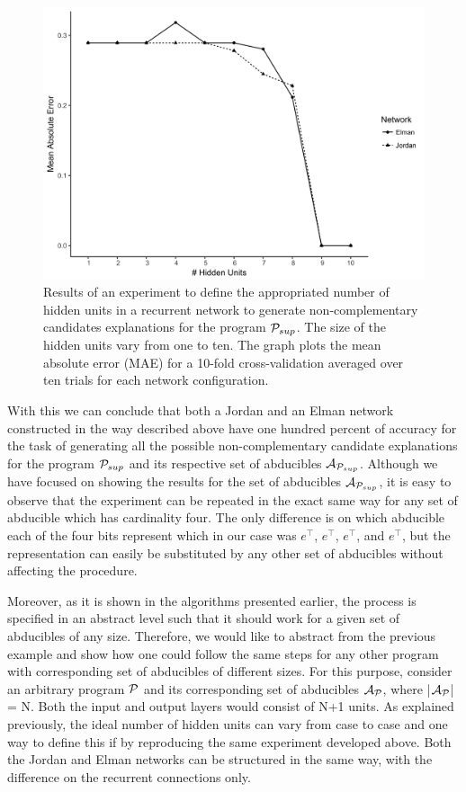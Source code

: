 \begin{figure}
	\centering
	\includegraphics[width=1.0\textwidth]{figures/error_nc_4}
	\caption{Results of an experiment to define the appropriated number of hidden units in a recurrent network to generate non-complementary candidates explanations for the program $\mathcal{P}_{sup}$. The size of the hidden units vary from one to ten. The graph plots the mean absolute error (MAE) for a 10-fold cross-validation averaged over ten trials for each network configuration.}
	\label{fig:error_nc_4}
\end{figure}

With this we can conclude that both a Jordan and an Elman network constructed in the way described above have one hundred percent of accuracy for the task of generating all the possible non-complementary candidate explanations for the program $\mathcal{P}_{sup}$ and its respective set of abducibles $\mathcal{A}_{\mathcal{P}_{sup}}$. Although we have focused on showing the results for the set of abducibles $\mathcal{A}_{\mathcal{P}_{sup}}$, it is easy to observe that the experiment can be repeated in the exact same way for any set of abducible which has cardinality four. The only difference is on which abducible each of the four bits represent which in our case was $e^\top$, $e^\top$, $e^\top$, and $e^\top$, but the representation can easily be substituted by any other set of abducibles without affecting the procedure.

Moreover, as it is shown in the algorithms presented earlier, the process is specified in an abstract level such that it should work for a given set of abducibles of any size. Therefore, we would like to abstract from the previous example and show how one could follow the same steps for any other program with corresponding set of abducibles of different sizes. For this purpose, consider an arbitrary program $\mathcal{P}$ and its corresponding set of abducibles $\mathcal{A}_{\mathcal{P}}$, where |$\mathcal{A}_{\mathcal{P}}$| = N. Both the input and output layers would consist of N+1 units. As explained previously, the ideal number of hidden units can vary from case to case and one way to define this if by reproducing the same experiment developed above. Both the Jordan and Elman networks can be structured in the same way, with the difference on the recurrent connections only.

